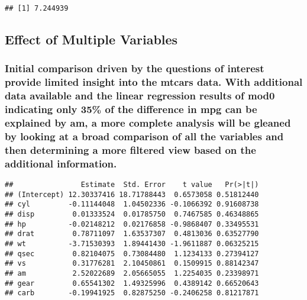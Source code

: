 \documentclass[]{article}
\newenvironment{Shaded}{\begin{snugshade}}{\end{snugshade}}
\newcommand{\KeywordTok}[1]{\textcolor[rgb]{0.13,0.29,0.53}{\textbf{#1}}}
\newcommand{\DataTypeTok}[1]{\textcolor[rgb]{0.13,0.29,0.53}{#1}}
\newcommand{\StringTok}[1]{\textcolor[rgb]{0.31,0.60,0.02}{#1}}
\newcommand{\OperatorTok}[1]{\textcolor[rgb]{0.81,0.36,0.00}{\textbf{#1}}}
\newcommand{\NormalTok}[1]{#1}
\begin{document}
\begin{verbatim}
## [1] 7.244939
\end{verbatim}

\subsection{Effect of Multiple
Variables}\label{effect-of-multiple-variables}

\subsubsection{Initial comparison driven by the questions of interest
provide limited insight into the mtcars data. With additional data
available and the linear regression results of mod0 indicating only 35\%
of the difference in mpg can be explained by am, a more complete
analysis will be gleaned by looking at a broad comparison of all the
variables and then determining a more filtered view based on the
additional
information.}\label{initial-comparison-driven-by-the-questions-of-interest-provide-limited-insight-into-the-mtcars-data.-with-additional-data-available-and-the-linear-regression-results-of-mod0-indicating-only-35-of-the-difference-in-mpg-can-be-explained-by-am-a-more-complete-analysis-will-be-gleaned-by-looking-at-a-broad-comparison-of-all-the-variables-and-then-determining-a-more-filtered-view-based-on-the-additional-information.}

\begin{Shaded}
\end{Shaded}

\begin{verbatim}
##                Estimate  Std. Error    t value   Pr(>|t|)
## (Intercept) 12.30337416 18.71788443  0.6573058 0.51812440
## cyl         -0.11144048  1.04502336 -0.1066392 0.91608738
## disp         0.01333524  0.01785750  0.7467585 0.46348865
## hp          -0.02148212  0.02176858 -0.9868407 0.33495531
## drat         0.78711097  1.63537307  0.4813036 0.63527790
## wt          -3.71530393  1.89441430 -1.9611887 0.06325215
## qsec         0.82104075  0.73084480  1.1234133 0.27394127
## vs           0.31776281  2.10450861  0.1509915 0.88142347
## am           2.52022689  2.05665055  1.2254035 0.23398971
## gear         0.65541302  1.49325996  0.4389142 0.66520643
## carb        -0.19941925  0.82875250 -0.2406258 0.81217871
\end{verbatim}
\end{document}
